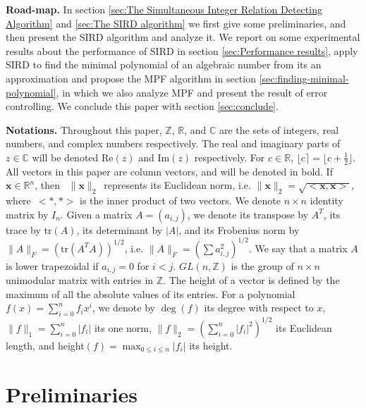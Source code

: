 \documentclass{sig-alternate}
\numberwithin{theorem}{section} \numberwithin{equation}{section}
\begin{document}
\textbf{{Road-map.}} In section \ref{sec:The Simultaneous Integer
Relation Detecting Algorithm} and \ref{sec:The SIRD algorithm} we
first give some preliminaries, and then present the SIRD algorithm
and analyze it. We report on some experimental results about the
performance of SIRD in section \ref{sec:Performance results}, apply
SIRD to find the minimal polynomial of an algebraic number from its
an approximation and propose the MPF algorithm in section
\ref{sec:finding-minimal-polynomial}, in which we also analyze  MPF
and present the result of error controlling. We conclude this paper
with section \ref{sec:conclude}.

\textbf{{Notations.}} Throughout this paper, $\mathbb{Z}$,
$\mathbb{R}$, and $\mathbb{C}$ are the sets of integers,  real
numbers, and complex numbers respectively. The real and imaginary
parts of $z\in\mathbb{C}$ will be denoted Re$(z)$ and Im$(z)$
respectively. For $c\in\mathbb{R}$, $\lfloor c \rceil = \lfloor c+\frac{1}{2}\rfloor$. All vectors in
this paper are column vectors, and will be denoted in bold.  If
$\mathbf{x} \in \mathbb{R}^n$, then ~$\|\mathbf{x}\|_2$~represents
its Euclidean norm, i.e. $\|\mathbf{x}\|_2 = \sqrt{<\mathbf{x},
\mathbf{x}>}$, where~$<*, *>$ is the inner product of two vectors.
We denote $n\times n$ identity matrix by $I_{n}$. Given a matrix $A
= (a_{i,j})$, we denote its transpose by $A^T$, its trace by
tr$(A)$, its determinant by $|A|$, and its Frobenius norm by
 $\|A\|_F = (\mbox{tr}(A^TA))^{1/2}$, i.e. $\|A\|_F = (\sum
a_{i,j}^2)^{1/2}$. We say that a matrix $A$ is lower trapezoidal if
$a_{i,j} = 0$ for $i < j$. $GL(n, \mathbb{Z})$ is the group of
$n\times n$ unimodular matrix with entries in $\mathbb{Z}$. The
height of a vector is defined by the maximum of all the absolute
values of its entries. For a polynomial $f(x) = \sum_{i=0}^n
f_ix^i$, we denote by $\deg(f)$ its degree with respect to $x$,
$\|f\|_{1} = \sum_{i=0}^n|f_{i}|$ its one norm,
 $\|f\|_2 = (\sum_{i=0}^n|f_{i}|^{2})^{1/2}$ its Euclidean length, and
height$(f)=\max_{0 \leq i \leq n}|f_{i}|$ its height.


\section{Preliminaries}
\label{sec:The Simultaneous Integer Relation Detecting Algorithm}
\end{document}
